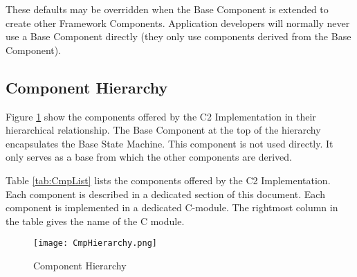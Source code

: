\documentclass{pnp_article}
\begin{document}
These defaults may be overridden when the Base Component is extended to create other Framework Components. Application developers will normally never use a Base Component directly (they only use components derived from the Base Component). 

\subsection{Component Hierarchy}\label{sec:CmpHierarchy} 
Figure \ref{fig:CmpHierarchy} show the components offered by the C2 Implementation in their hierarchical relationship. The Base Component at the top of the hierarchy encapsulates the Base State Machine. This component is not used directly. It only serves as a base from which the other components are derived.

Table \ref{tab:CmpList} lists the components offered by the C2 Implementation. Each component is described in a dedicated section of this document. Each component is implemented in a dedicated C-module. The rightmost column in the table gives the name of the C module.

\begin{figure}[H]
 \centering
 \texttt{[image: CmpHierarchy.png]}
 \caption{Component Hierarchy}
 \label{fig:CmpHierarchy}
\end{figure}
\end{document}
